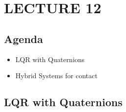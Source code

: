 \newpage
\section{LECTURE 12}

\subsection{Agenda}
\begin{itemize}
    \item LQR with Quaternions
    \item Hybrid Systems for contact
\end{itemize}

\subsection{LQR with Quaternions}
